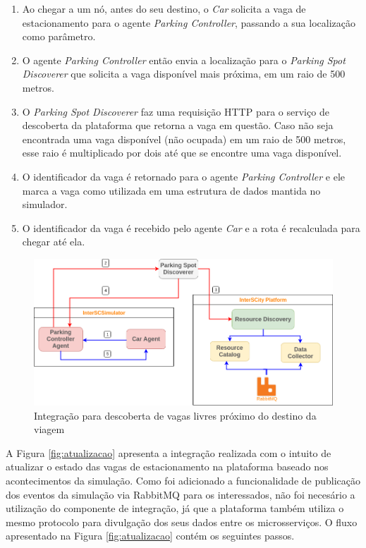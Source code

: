 \begin{enumerate}
    \item Ao chegar a um nó, antes do seu destino, o \textit{Car} solicita a vaga de estacionamento para o agente \textit{Parking Controller}, passando a sua
	localização como parâmetro.

	\item O agente \textit{Parking Controller} então envia a localização para o \textit{Parking Spot Discoverer} que solicita a vaga disponível mais próxima,
	em um raio de 500 metros.

	\item O \textit{Parking Spot Discoverer} faz uma requisição HTTP para o serviço de descoberta da plataforma que retorna a vaga em questão.
	Caso não seja encontrada uma vaga disponível (não ocupada) em um raio de 500 metros, esse raio é multiplicado por dois até que se encontre uma vaga
	disponível.

	\item O identificador da vaga é retornado para o agente \textit{Parking Controller} e ele marca a vaga como utilizada em uma estrutura de dados mantida no simulador.

    \item O identificador da vaga é recebido pelo agente \textit{Car} e a rota é recalculada para chegar até ela.
\end{enumerate}

\begin{figure}[ht]
	\centering
	\includegraphics[width=\textwidth]{figuras/integration_get_data_smart_parking.png}
	\caption{Integração para descoberta de vagas livres próximo do destino da
	viagem}
	\label{fig:descoberta}
\end{figure}

A Figura \ref{fig:atualizacao} apresenta a integração realizada com o intuito de atualizar o estado das vagas de estacionamento na plataforma baseado nos
acontecimentos da simulação.
Como foi adicionado a funcionalidade de publicação dos eventos da simulação via RabbitMQ para os interessados, não foi necesário a utilização do
componente de integração, já que a plataforma também utiliza o mesmo protocolo para divulgação dos seus dados entre os microsserviços.
O fluxo apresentado na Figura \ref{fig:atualizacao} contém os seguintes passos.

